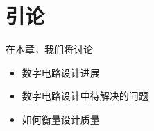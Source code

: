 \chapter{引论}

在本章，我们将讨论
\begin{itemize}
    \item 数字电路设计进展
    \item 数字电路设计中待解决的问题
    \item 如何衡量设计质量
\end{itemize}


